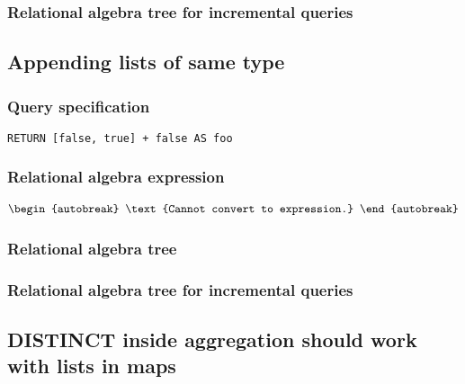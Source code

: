 
\subsubsection*{Relational algebra tree for incremental queries}


\subsection{Appending lists of same type}

\subsubsection*{Query specification}

\begin{lstlisting}
RETURN [false, true] + false AS foo
\end{lstlisting}

\subsubsection*{Relational algebra expression}

\begin{align*}
\begin{autobreak}
\text{Cannot convert to expression.}
\end{autobreak}
\end{align*}

\subsubsection*{Relational algebra tree}


\subsubsection*{Relational algebra tree for incremental queries}


\subsection{DISTINCT inside aggregation should work with lists in maps}

